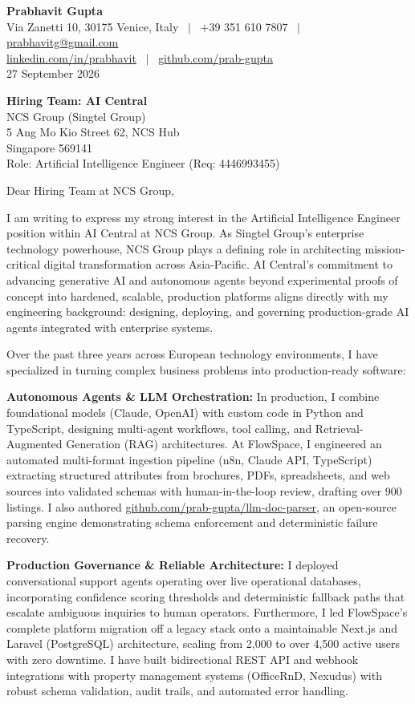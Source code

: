 \documentclass[10.5pt,a4paper]{article}
\begin{document}
\textbf{\large Prabhavit Gupta}\\
Via Zanetti 10, 30175 Venice, Italy ~$\vert$~ +39 351 610 7807 ~$\vert$~ \href{mailto:prabhavitg@gmail.com}{prabhavitg@gmail.com}\\
\href{https://www.linkedin.com/in/prabhavit/}{linkedin.com/in/prabhavit} ~$\vert$~ \href{https://github.com/prab-gupta}{github.com/prab-gupta}\\
27 September 2026

\textbf{Hiring Team: AI Central}\\
NCS Group (Singtel Group)\\
5 Ang Mo Kio Street 62, NCS Hub\\
Singapore 569141\\
Role: Artificial Intelligence Engineer (Req: 4446993455)

Dear Hiring Team at NCS Group,

I am writing to express my strong interest in the Artificial Intelligence Engineer position within AI Central at NCS Group. As Singtel Group's enterprise technology powerhouse, NCS Group plays a defining role in architecting mission-critical digital transformation across Asia-Pacific. AI Central's commitment to advancing generative AI and autonomous agents beyond experimental proofs of concept into hardened, scalable, production platforms aligns directly with my engineering background: designing, deploying, and governing production-grade AI agents integrated with enterprise systems.

Over the past three years across European technology environments, I have specialized in turning complex business problems into production-ready software:

\textbf{Autonomous Agents \& LLM Orchestration:} In production, I combine foundational models (Claude, OpenAI) with custom code in Python and TypeScript, designing multi-agent workflows, tool calling, and Retrieval-Augmented Generation (RAG) architectures. At FlowSpace, I engineered an automated multi-format ingestion pipeline (n8n, Claude API, TypeScript) extracting structured attributes from brochures, PDFs, spreadsheets, and web sources into validated schemas with human-in-the-loop review, drafting over 900 listings. I also authored \href{https://github.com/prab-gupta/llm-doc-parser}{github.com/prab-gupta/llm-doc-parser}, an open-source parsing engine demonstrating schema enforcement and deterministic failure recovery.

\textbf{Production Governance \& Reliable Architecture:} I deployed conversational support agents operating over live operational databases, incorporating confidence scoring thresholds and deterministic fallback paths that escalate ambiguous inquiries to human operators. Furthermore, I led FlowSpace's complete platform migration off a legacy stack onto a maintainable Next.js and Laravel (PostgreSQL) architecture, scaling from 2,000 to over 4,500 active users with zero downtime. I have built bidirectional REST API and webhook integrations with property management systems (OfficeRnD, Nexudus) with robust schema validation, audit trails, and automated error handling.
\end{document}
